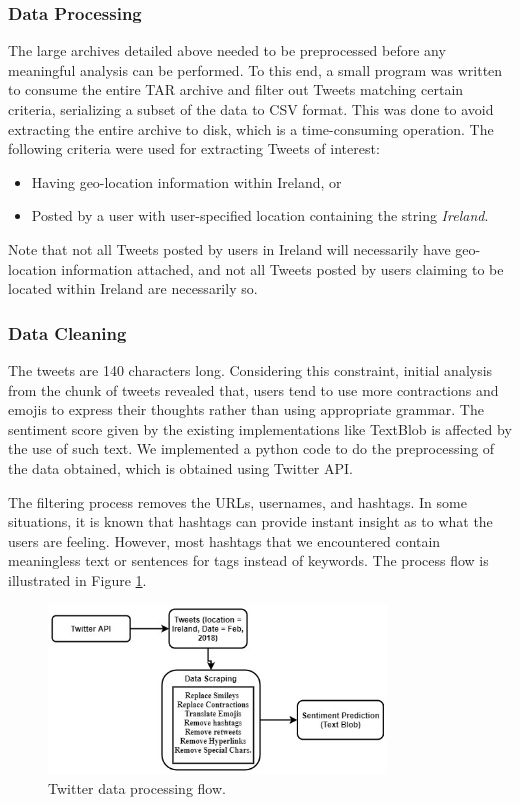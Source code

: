 \documentclass[a4paper,10pt]{article}
\begin{document}
    \subsubsection{Data Processing}

    The large archives detailed above needed to be preprocessed before any meaningful analysis can be performed. To this end, a small program was written to consume the entire TAR archive and filter out Tweets matching certain criteria, serializing a subset of the data to CSV format. This was done to avoid extracting the entire archive to disk, which is a time-consuming operation. The following criteria were used for extracting Tweets of interest:
    \begin{itemize}
        \item{
            Having geo-location information within Ireland, or
        }
        \item{
            Posted by a user with user-specified location containing the string \textit{Ireland}.
        }
    \end{itemize}

    Note that not all Tweets posted by users in Ireland will necessarily have geo-location information attached, and not all Tweets posted by users claiming to be located within Ireland are necessarily so.

    \subsubsection{Data Cleaning}

    The tweets are 140 characters long. Considering this constraint, initial analysis from the chunk of tweets revealed that, users tend to use more contractions and emojis to express their thoughts rather than using appropriate grammar. The sentiment score given by the existing implementations like TextBlob is affected by the use of such text. We implemented a python code to do the preprocessing of the data obtained, which is obtained using Twitter API.

    The filtering process removes the URLs, usernames, and hashtags. In some situations, it is known that hashtags can provide instant insight as to what the users are feeling. However, most hashtags that we encountered contain meaningless text or sentences for tags instead of keywords. The process flow is illustrated in Figure \ref{fig:twitter_process_flow}.

    \begin{figure}
        \includegraphics[width=0.8\textwidth]{twitter_process_flow.jpeg}
        \caption{Twitter data processing flow.}
        \label{fig:twitter_process_flow}
    \end{figure}
\end{document}
